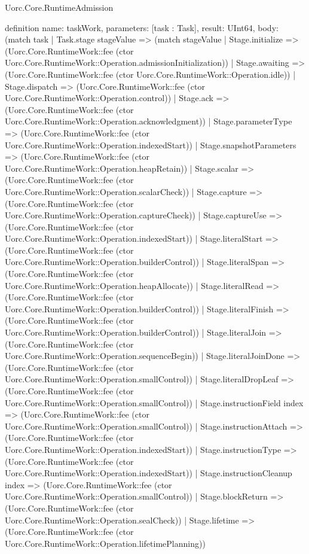 \begin{lexlean}{Uorc.Core.RuntimeAdmission}
\begin{semanticmodule}
definition{
  name: taskWork,
  parameters: [task : Task],
  result: UInt64,
  body: (match task
    | Task.stage stageValue => (match stageValue
      | Stage.initialize => (Uorc.Core.RuntimeWork::fee (ctor Uorc.Core.RuntimeWork::Operation.admissionInitialization))
      | Stage.awaiting => (Uorc.Core.RuntimeWork::fee (ctor Uorc.Core.RuntimeWork::Operation.idle))
      | Stage.dispatch => (Uorc.Core.RuntimeWork::fee (ctor Uorc.Core.RuntimeWork::Operation.control))
      | Stage.ack => (Uorc.Core.RuntimeWork::fee (ctor Uorc.Core.RuntimeWork::Operation.acknowledgment))
      | Stage.parameterType => (Uorc.Core.RuntimeWork::fee (ctor Uorc.Core.RuntimeWork::Operation.indexedStart))
      | Stage.snapshotParameters => (Uorc.Core.RuntimeWork::fee (ctor Uorc.Core.RuntimeWork::Operation.heapRetain))
      | Stage.scalar => (Uorc.Core.RuntimeWork::fee (ctor Uorc.Core.RuntimeWork::Operation.scalarCheck))
      | Stage.capture => (Uorc.Core.RuntimeWork::fee (ctor Uorc.Core.RuntimeWork::Operation.captureCheck))
      | Stage.captureUse => (Uorc.Core.RuntimeWork::fee (ctor Uorc.Core.RuntimeWork::Operation.indexedStart))
      | Stage.literalStart => (Uorc.Core.RuntimeWork::fee (ctor Uorc.Core.RuntimeWork::Operation.builderControl))
      | Stage.literalSpan => (Uorc.Core.RuntimeWork::fee (ctor Uorc.Core.RuntimeWork::Operation.heapAllocate))
      | Stage.literalRead => (Uorc.Core.RuntimeWork::fee (ctor Uorc.Core.RuntimeWork::Operation.builderControl))
      | Stage.literalFinish => (Uorc.Core.RuntimeWork::fee (ctor Uorc.Core.RuntimeWork::Operation.builderControl))
      | Stage.literalJoin => (Uorc.Core.RuntimeWork::fee (ctor Uorc.Core.RuntimeWork::Operation.sequenceBegin))
      | Stage.literalJoinDone => (Uorc.Core.RuntimeWork::fee (ctor Uorc.Core.RuntimeWork::Operation.smallControl))
      | Stage.literalDropLeaf => (Uorc.Core.RuntimeWork::fee (ctor Uorc.Core.RuntimeWork::Operation.smallControl))
      | Stage.instructionField index => (Uorc.Core.RuntimeWork::fee (ctor Uorc.Core.RuntimeWork::Operation.smallControl))
      | Stage.instructionAttach => (Uorc.Core.RuntimeWork::fee (ctor Uorc.Core.RuntimeWork::Operation.indexedStart))
      | Stage.instructionType => (Uorc.Core.RuntimeWork::fee (ctor Uorc.Core.RuntimeWork::Operation.indexedStart))
      | Stage.instructionCleanup index => (Uorc.Core.RuntimeWork::fee (ctor Uorc.Core.RuntimeWork::Operation.smallControl))
      | Stage.blockReturn => (Uorc.Core.RuntimeWork::fee (ctor Uorc.Core.RuntimeWork::Operation.sealCheck))
      | Stage.lifetime => (Uorc.Core.RuntimeWork::fee (ctor Uorc.Core.RuntimeWork::Operation.lifetimePlanning))
}
\end{semanticmodule}
\end{lexlean}
